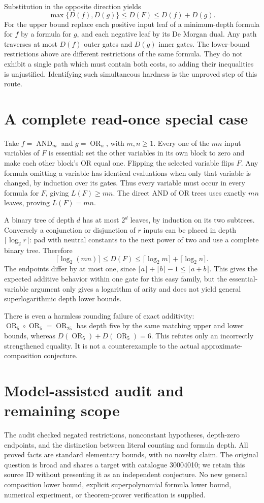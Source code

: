 \documentclass[11pt]{article}
\begin{document}
Substitution in the opposite direction yields
\[
\max\{D(f),D(g)\}\le D(F)\le D(f)+D(g).
\]
For the upper bound replace each positive input leaf of a minimum-depth
formula for $f$ by a formula for $g$, and each negative leaf by its
De Morgan dual. Any path traverses at most $D(f)$ outer gates and
$D(g)$ inner gates. The lower-bound restrictions above are different
restrictions of the same formula. They do not exhibit a single path
which must contain both costs, so adding their inequalities is unjustified.
Identifying such simultaneous hardness is the unproved step of this route.

\section{A complete read-once special case}
Take $f=\operatorname{AND}_m$ and $g=\operatorname{OR}_n$, with
$m,n\ge1$. Every one of the $mn$ input variables of $F$ is essential:
set the other variables in its own block to zero and make each other
block's OR equal one. Flipping the selected variable flips $F$.
Any formula omitting a variable has identical evaluations when only that
variable is changed, by induction over its gates. Thus every variable
must occur in every formula for $F$, giving $L(F)\ge mn$.
The direct AND of OR trees uses exactly $mn$ leaves, proving $L(F)=mn$.

A binary tree of depth $d$ has at most $2^d$ leaves, by induction on
its two subtrees. Conversely a conjunction or disjunction of $r$ inputs
can be placed in depth $\lceil\log_2r\rceil$: pad with neutral constants
to the next power of two and use a complete binary tree.
Therefore
\[
\lceil\log_2(mn)\rceil\le D(F)
\le\lceil\log_2m\rceil+\lceil\log_2n\rceil.
\]
The endpoints differ by at most one, since
$\lceil a\rceil+\lceil b\rceil-1\le\lceil a+b\rceil$.
This gives the expected additive behavior within one gate for this easy
family, but the essential-variable argument only gives a logarithm of
arity and does not yield general superlogarithmic depth lower bounds.

There is even a harmless rounding failure of exact additivity:
$\operatorname{OR}_5\circ\operatorname{OR}_5=\operatorname{OR}_{25}$
has depth five by the same matching upper and lower bounds, whereas
$D(\operatorname{OR}_5)+D(\operatorname{OR}_5)=6$.
This refutes only an incorrectly strengthened equality. It is not a
counterexample to the actual approximate-composition conjecture.

\section{Model-assisted audit and remaining scope}
The audit checked negated restrictions, nonconstant hypotheses, depth-zero
endpoints, and the distinction between literal counting and formula depth.
All proved facts are standard elementary bounds, with no novelty claim.
The original question is broad and shares a target with catalogue 30004010;
we retain this source ID without presenting it as an independent conjecture.
No new general composition lower bound, explicit superpolynomial formula
lower bound, numerical experiment, or theorem-prover verification is supplied.
\end{document}
